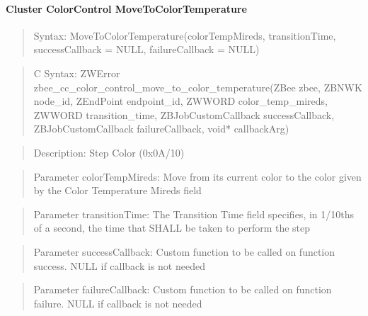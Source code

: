 \paragraph{Cluster ColorControl MoveToColorTemperature}
\begin{quote}Syntax: MoveToColorTemperature(colorTempMireds, transitionTime, successCallback = NULL, failureCallback = NULL)\end{quote}
\begin{quote}C Syntax: ZWError zbee\_cc\_color\_control\_move\_to\_color\_temperature(ZBee zbee, ZBNWK node\_id, ZEndPoint endpoint\_id, ZWWORD color\_temp\_mireds, ZWWORD transition\_time, ZBJobCustomCallback successCallback, ZBJobCustomCallback failureCallback, void* callbackArg)\end{quote}
\begin{quote}Description: Step Color (0x0A/10)\end{quote}
\begin{quote}Parameter colorTempMireds: Move from its current color to the color given by the Color Temperature Mireds field\end{quote}
\begin{quote}Parameter transitionTime: The Transition Time field specifies, in 1/10ths of a second, the time that SHALL be taken to perform the step\end{quote}
\begin{quote}Parameter successCallback: Custom function to be called on function success. NULL if callback is not needed\end{quote}
\begin{quote}Parameter failureCallback: Custom function to be called on function failure. NULL if callback is not needed\end{quote}


